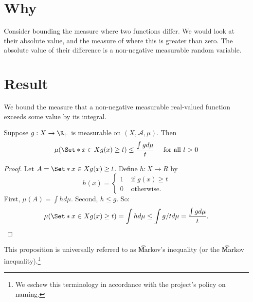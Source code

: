 
\section*{Why}

Consider bounding the measure where two functions differ.
We would look at their absolute value, and the measure of where this is greater than zero.
The absolute value of their difference is a non-negative measurable random variable.

\section*{Result}

We bound the measure that a non-negative measurable real-valued function exceeds some value by its integral.

\begin{proposition}
Suppose $g: X \to \R _+$ is measurable on $(X, \mathcal{A} , \mu )$.
Then
\[
\mu (\Set*{x \in X}{g(x) \geq t}) \leq \frac{\int  g d\mu }{t}
\quad
\text{ for all } t > 0
\]
\begin{proof}Let $A = \Set*{x \in X}{g(x) \geq t}$.
Define $h: X \to R$ by
\[
h(x) = \begin{cases}
1 & \text{ if } g(x) \geq t \\
0 & \text{ otherwise. }
\end{cases}
\]
First, $\mu (A) = \int  h d\mu $.
Second, $h \leq g$.
So:
\[
\mu (\Set*{x \in X}{g(x) \geq t})
= \int  h d\mu
\leq \int  g/t d\mu
= \frac{\int  g d\mu }{t}.
\]\end{proof}
\end{proposition}

This proposition is universally referred to as \t{Markov's inequality} (or the \t{Markov inequality}).\footnote{We eschew this terminology in accordance with the project's policy on naming.}

\blankpage
